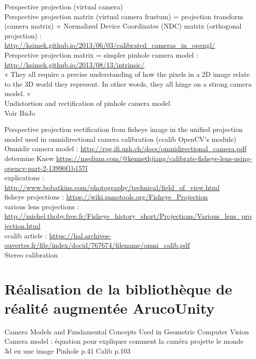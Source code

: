 Perspective projection (virtual camera)\\
Perspective projection matrix (virtual camera frustum) = projection transform (camera matrix) + Normalized Device Coordinates (NDC) matrix (orthogonal projection) : \url{http://ksimek.github.io/2013/06/03/calibrated_cameras_in_opengl/}\\
Perspective projection matrix = simpler pinhole camera model : \url{http://ksimek.github.io/2013/08/13/intrinsic/}\\
« They all require a precise understanding of how the pixels in a 2D image relate to the 3D world they represent. In other words, they all hinge on a strong camera model. »\\

Undistortion and rectification of pinhole camera model\\
Voir BuJo

Perspective projection rectification from fisheye image in the unified projection model used in omnidirectional camera calibration (ccalib OpenCV's module)\\
Omnidir camera model : \url{http://rpg.ifi.uzh.ch/docs/omnidirectional_camera.pdf}\\
determine Knew \url{https://medium.com/@kennethjiang/calibrate-fisheye-lens-using-opencv-part-2-13990f1b157f}\\
explications : \url{http://www.bobatkins.com/photography/technical/field_of_view.html}\\
fisheye projections : \url{https://wiki.panotools.org/Fisheye_Projection}\\
various lens projections : \url{http://michel.thoby.free.fr/Fisheye_history_short/Projections/Various_lens_projection.html}\\
ccalib article : \url{https://hal.archives-ouvertes.fr/file/index/docid/767674/filename/omni_calib.pdf}\\

Stereo calibration


\section{Réalisation de la bibliothèque de réalité augmentée ArucoUnity}
Camera Models and Fundamental Concepts Used in Geometric Computer Vision
Camera model : équation pour expliquer comment la caméra projette le monde 3d en une image
Pinhole p.41
Calib p.103

